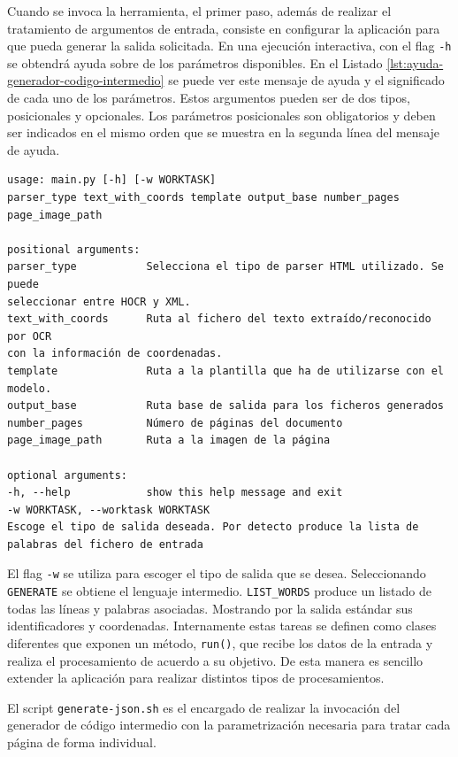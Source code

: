 Cuando se invoca la herramienta, el primer paso, además de realizar el tratamiento de argumentos de entrada, consiste en configurar la aplicación para que pueda generar la salida solicitada. En una ejecución interactiva, con el flag \verb|-h| se obtendrá ayuda sobre de los parámetros disponibles. En el Listado \ref{lst:ayuda-generador-codigo-intermedio} se puede ver este mensaje de ayuda y el significado de cada uno de los parámetros. Estos argumentos pueden ser de dos tipos, posicionales y opcionales. Los parámetros posicionales son obligatorios y deben ser indicados en el mismo orden que se muestra en la segunda línea del mensaje de ayuda. 

\begin{lstlisting}[caption={Ayuda del generador de código intermedio.},label=lst:ayuda-generador-codigo-intermedio]
usage: main.py [-h] [-w WORKTASK]
parser_type text_with_coords template output_base number_pages page_image_path

positional arguments:
parser_type           Selecciona el tipo de parser HTML utilizado. Se puede
seleccionar entre HOCR y XML.
text_with_coords      Ruta al fichero del texto extraído/reconocido por OCR
con la información de coordenadas.
template              Ruta a la plantilla que ha de utilizarse con el
modelo.
output_base           Ruta base de salida para los ficheros generados
number_pages          Número de páginas del documento
page_image_path       Ruta a la imagen de la página

optional arguments:
-h, --help            show this help message and exit
-w WORKTASK, --worktask WORKTASK
Escoge el tipo de salida deseada. Por detecto produce la lista de palabras del fichero de entrada
\end{lstlisting}

El flag \verb|-w| se utiliza para escoger el tipo de salida que se desea. Seleccionando \verb|GENERATE| se obtiene el lenguaje intermedio. \verb|LIST_WORDS| produce un listado de todas las líneas y palabras asociadas. Mostrando por la salida estándar sus identificadores y coordenadas. Internamente estas tareas se definen como clases diferentes que exponen un método, \verb|run()|, que recibe los datos de la entrada y realiza el procesamiento de acuerdo a su objetivo. De esta manera es sencillo extender la aplicación para realizar distintos tipos de procesamientos.

El script \verb|generate-json.sh| es el encargado de realizar la invocación del generador de código intermedio con la parametrización necesaria para tratar cada página de forma individual.


